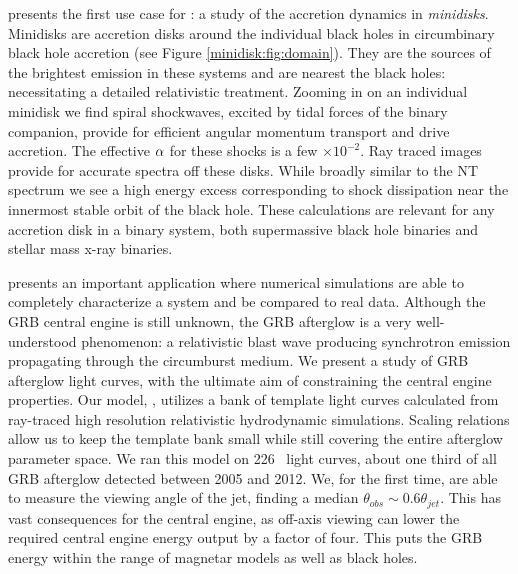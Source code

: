  presents the first use case for \grdisco: a study of the accretion dynamics in \emph{minidisks}.  Minidisks are accretion disks around the individual black holes in circumbinary black hole accretion (see Figure \ref{minidisk:fig:domain}).  They are the sources of the brightest emission in these systems and are nearest the black holes: necessitating a detailed relativistic treatment.  Zooming in on an individual minidisk we find spiral shockwaves, excited by tidal forces of the binary companion, provide for efficient angular momentum transport and drive accretion.  The effective $\alpha$ for these shocks is a few $\times 10^{-2}$.  Ray traced images provide for accurate spectra off these disks.  While broadly similar to the NT spectrum we see a high energy excess corresponding to shock dissipation near the innermost stable orbit of the black hole.  These calculations are relevant for any accretion disk in a binary system, both supermassive black hole binaries and stellar mass x-ray binaries.  

 presents an important application where numerical simulations are able to completely characterize a system and be compared to real data.  Although the GRB central engine is still unknown, the GRB afterglow is a very well-understood phenomenon: a relativistic blast wave producing synchrotron emission propagating through the circumburst medium.  We present a study of GRB afterglow light curves, with the ultimate aim of constraining the central engine properties.  Our model, \scalefit, utilizes a bank of template light curves calculated from ray-traced high resolution relativistic hydrodynamic simulations.  Scaling relations allow us to keep the template bank small while still covering the entire afterglow parameter space.  We ran this model on 226 \swiftXRT\ light curves, about one third of all GRB afterglow detected between 2005 and 2012.  We, for the first time, are able to measure the viewing angle of the jet, finding a median $\theta_{obs} \sim 0.6 \theta_{jet}$.  This has vast consequences for the central engine, as off-axis viewing can lower the required central engine energy output by a factor of four.  This puts the GRB energy within the range of magnetar models as well as black holes.

